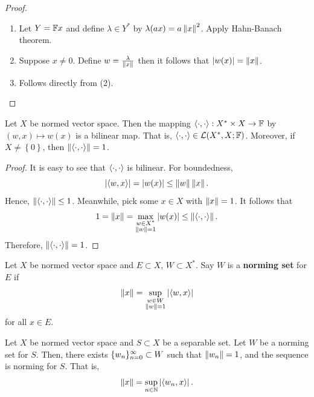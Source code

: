 \documentclass[a4paper]{article}
\begin{document}
\begin{proof}

\begin{enumerate}
\item Let $Y = \mathbb{F} x$ and define $\lambda \in Y^*$ by
$\lambda(a x) = a \left\lVert x\right\rVert^2$. Apply Hahn-Banach theorem.

\item Suppose $x \neq 0$. Define $w = \frac{\lambda}{\left\lVert x\right\rVert}$
then it follows that $\left\lvert w(x)\right\rvert = \left\lVert x\right\rVert$.

\item Follows directly from (2).
\end{enumerate}

\end{proof}

\begin{prop}
Let $X$ be normed vector space. Then the mapping
$\left\langle \cdot, \cdot \right\rangle : X^* \times X \to \mathbb{F}$ by
$(w, x) \mapsto w(x)$ is a bilinear map. That is,
$\left\langle \cdot , \cdot \right\rangle \in \mathcal{L}(X^*, X ; \mathbb{F})$.
Moreover,
if $X \neq \left\{ 0 \right\}$,
then $\left\lVert \left\langle \cdot, \cdot \right\rangle\right\rVert
= 1$.
\end{prop}

\begin{proof}
It is easy to see that $\left\langle \cdot, \cdot \right\rangle$ is
bilinear.  For boundedness,
\[
\left\lvert \left\langle w, x \right\rangle\right\rvert = \left\lvert w(x)\right\rvert \leq \left\lVert w\right\rVert \left\lVert x\right\rVert.
\]
Hence, $\left\lVert \left\langle \cdot, \cdot \right\rangle\right\rVert \leq 1$. Meanwhile,
pick some $x \in X$ with $\left\lVert x\right\rVert = 1$. It follows that
\[
1 = \left\lVert x\right\rVert = \max_{\substack{w \in X^* \\ \left\lVert w\right\rVert = 1}}
\left\lvert w(x)\right\rvert \leq \left\lVert \left\langle \cdot, \cdot \right\rangle\right\rVert.
\]
Therefore, $\left\lVert \left\langle \cdot, \cdot \right\rangle\right\rVert = 1$.
\end{proof}

\begin{defi}
  Let $X$ be normed vector space and $E \subset X$,
  $W \subset X^*$. Say $W$ is a \textbf{norming set}
  for $E$ if
  \[
  \left\lVert x\right\rVert = \sup_{\substack{w \in W \\ \left\lVert w\right\rVert = 1}}
  \left\lvert \left\langle w, x \right\rangle\right\rvert
  \]
  for all $x \in E$.
\end{defi}

\begin{prop}

Let $X$ be normed vector space and $S \subset X$ be a
separable set. Let $W$ be a norming set for $S$. Then,
there exists $\{ w_n \}_{n=0}^\infty \subset W$ such that $\left\lVert w_n\right\rVert
= 1$, and the sequence is norming for $S$. That is,
\[
\left\lVert x\right\rVert = \sup_{n \in \mathbb{N}} \left\lvert \left\langle w_n, x \right\rangle\right\rvert.
\]
\end{prop}
\end{document}
